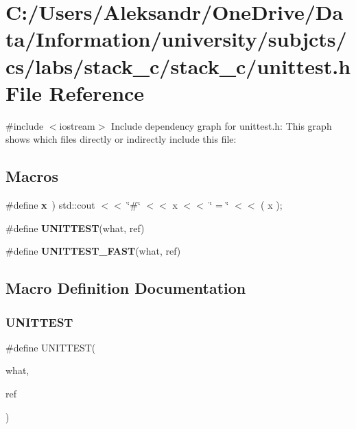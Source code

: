 \section{C\+:/\+Users/\+Aleksandr/\+One\+Drive/\+Data/\+Information/university/subjcts/cs/labs/stack\+\_\+c/stack\+\_\+c/unittest.h File Reference}
\label{unittest_8h}
{\ttfamily \#include $<$iostream$>$}\newline
Include dependency graph for unittest.\+h\+:
This graph shows which files directly or indirectly include this file\+:
\subsection*{Macros}
\begin{DoxyCompactItemize}
\item 
\#define \textbf{ x}~) std\+::cout $<$$<$ \char`\"{}\#\char`\"{} $<$$<$ x $<$$<$ \char`\"{} = \char`\"{} $<$$<$ ( x );
\item 
\#define \textbf{ U\+N\+I\+T\+T\+E\+ST}(what,  ref)
\item 
\#define \textbf{ U\+N\+I\+T\+T\+E\+S\+T\+\_\+\+F\+A\+ST}(what,  ref)
\end{DoxyCompactItemize}


\subsection{Macro Definition Documentation}
\mbox{\label{unittest_8h_ade10b9999d8c62576f5078598599d481}} 
\subsubsection{U\+N\+I\+T\+T\+E\+ST}
{\footnotesize\ttfamily \#define U\+N\+I\+T\+T\+E\+ST(\begin{DoxyParamCaption}\item[{}]{what,  }\item[{}]{ref }\end{DoxyParamCaption})}

